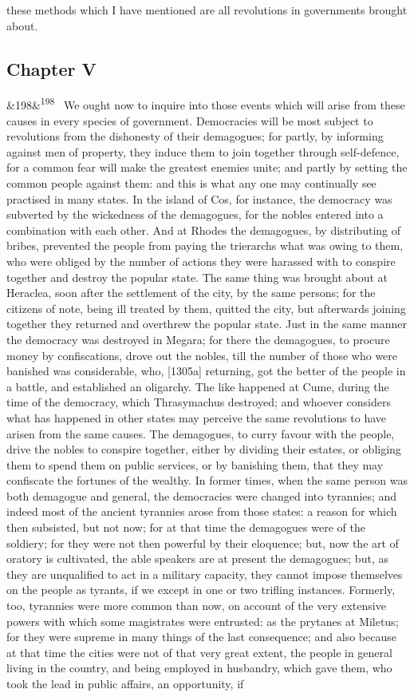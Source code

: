 \documentclass[12pt]{article}
\newcommand{\para}[1][]{\par\noindent\ifx&#1&\else\textsuperscript{\footnotesize #1}~\fi}
\begin{document}
these methods which I have mentioned are all revolutions in governments brought about.

\subsection*{Chapter V}

\para[198] We ought now to inquire into those events which will arise from these causes in every species of government. Democracies will be most subject to revolutions from the dishonesty of their demagogues; for partly, by informing against men of property, they induce them to join together through self-defence, for a common fear will make the greatest enemies unite; and partly by setting the common people against them: and this is what any one may continually see practised in many states. In the island of Cos, for instance, the democracy was subverted by the wickedness of the demagogues, for the nobles entered into a combination with each other. And at Rhodes the demagogues, by distributing of bribes, prevented the people from paying the trierarchs what was owing to them, who were obliged by the number of actions they were harassed with to conspire together and destroy the popular state. The same thing was brought about at Heraclea, soon after the settlement of the city, by the same persons; for the citizens of note, being ill treated by them, quitted the city, but afterwards joining together they returned and overthrew the popular state. Just in the same manner the democracy was destroyed in Megara; for there the demagogues, to procure money by confiscations, drove out the nobles, till the number of those who were banished was considerable, who, [1305a] returning, got the better of the people in a battle, and established an oligarchy. The like happened at Cume, during the time of the democracy, which Thrasymachus destroyed; and whoever considers what has happened in other states may perceive the same revolutions to have arisen from the same causes. The demagogues, to curry favour with the people, drive the nobles to conspire together, either by dividing their estates, or obliging them to spend them on public services, or by banishing them, that they may confiscate the fortunes of the wealthy. In former times, when the same person was both demagogue and general, the democracies were changed into tyrannies; and indeed most of the ancient tyrannies arose from those states: a reason for which then subsisted, but not now; for at that time the demagogues were of the soldiery; for they were not then powerful by their eloquence; but, now the art of oratory is cultivated, the able speakers are at present the demagogues; but, as they are unqualified to act in a military capacity, they cannot impose themselves on the people as tyrants, if we except in one or two trifling instances. Formerly, too, tyrannies were more common than now, on account of the very extensive powers with which some magistrates were entrusted: as the prytanes at Miletus; for they were supreme in many things of the last consequence; and also because at that time the cities were not of that very great extent, the people in general living in the country, and being employed in husbandry, which gave them, who took the lead in public affairs, an opportunity, if 
\end{document}
